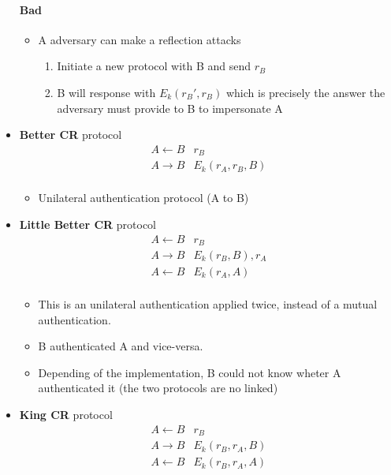 \begin{itemize}
        \paragraph{Bad}
        \begin{itemize}
        \item A adversary can make a reflection attacks
            \begin{enumerate}
                \item Initiate a new protocol with B and send $r_B$
                \item B will response with $E_k(r_B', r_B)$ which is
                    precisely the answer the adversary must provide
                    to B to impersonate A
            \end{enumerate}
        \end{itemize}

    \item \textbf{Better CR} protocol
        \begin{eqnarray*}
            A \leftarrow B & r_B \\
            A \rightarrow B & E_k(r_A, r_B, B) \\
        \end{eqnarray*}

        \begin{itemize}
            \item Unilateral authentication protocol (A to B)
        \end{itemize}

    \item \textbf{Little Better CR} protocol
        \begin{eqnarray*}
            A \leftarrow B & r_B \\
            A \rightarrow B & E_k(r_B, B), r_A \\
            A \leftarrow B & E_k(r_A, A) \\
        \end{eqnarray*}
        
         \begin{itemize}
            \item This is an unilateral authentication applied twice, instead of a mutual
            authentication.
            \item B authenticated A and vice-versa.
            \item Depending of the implementation, B could not know wheter A
            authenticated it  (the two protocols are no linked)
        \end{itemize}
        
	\item \textbf{King CR} protocol
		\begin{eqnarray*}
			A \leftarrow B & r_B \\
			A \rightarrow B & E_k(r_B,r_A, B) \\
			A \leftarrow B & E_k(r_B,r_A,A) \\
		\end{eqnarray*}
\end{itemize}


